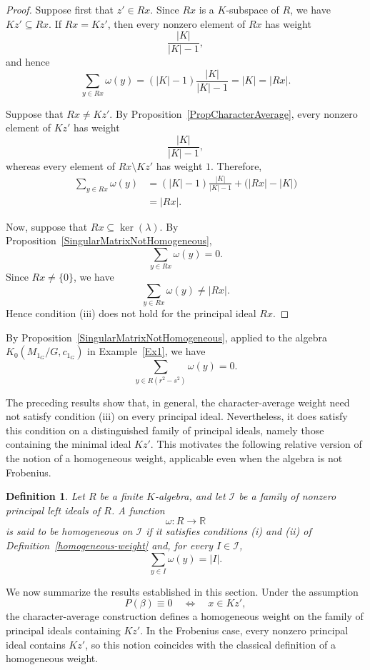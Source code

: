 \documentclass[11pt,reqno]{amsart}
\theoremstyle{plain}
\newtheorem{ddef}[thm]{Definition}
\theoremstyle{remark}
\theoremstyle{definition}
\begin{document}
\begin{proof}
Suppose first that \(z'\in Rx\). Since \(Rx\) is a \(K\)-subspace of \(R\),
we have
\(Kz'\subseteq Rx.\)
If \(Rx=Kz'\), then every nonzero element of \(Rx\) has weight
\[
\frac{|K|}{|K|-1},
\]
and hence
\[
\sum_{y\in Rx}\omega(y)
=
(|K|-1)\frac{|K|}{|K|-1}
=
|K|
=
|Rx|.
\]

Suppose that \(Rx\neq Kz'\). By
Proposition~\ref{PropCharacterAverage}, every nonzero element of \(Kz'\)
has weight
\[
\frac{|K|}{|K|-1},
\]
whereas every element of \(Rx\setminus Kz'\) has weight \(1\).
Therefore,
\[
\begin{aligned}
\sum_{y\in Rx}\omega(y)
&=
(|K|-1)\frac{|K|}{|K|-1}
+
\bigl(|Rx|-|K|\bigr)\\
&=
|Rx|.
\end{aligned}
\]

Now, suppose that
\(Rx\subseteq\ker(\lambda).\)
By Proposition~\ref{SingularMatrixNotHomogeneous},
\[
\sum_{y\in Rx}\omega(y)=0.
\]
Since \(Rx\neq\{0\}\), we have
\[
\sum_{y\in Rx}\omega(y)\neq |Rx|.
\]
Hence condition {\rm(iii)} does not hold for the principal ideal \(Rx\).
\end{proof}

By Proposition~\ref{SingularMatrixNotHomogeneous}, applied to the algebra
\(K_0(M_{1_G}/G,c_{1_G})\) in Example~\ref{Ex1}, we have
\[
\sum_{y\in R(r^2-s^2)}\omega(y)=0.
\]

The preceding results show that, in general, the character-average weight need not satisfy condition {\rm(iii)} on every principal ideal. Nevertheless, it does satisfy this condition on a distinguished family of principal ideals, namely those containing the minimal ideal \(Kz'\). This motivates the following relative version of the notion of a homogeneous weight, applicable even when the algebra is not Frobenius.

\begin{ddef}\label{RelativeHomogeneousWeight}
Let \(R\) be a finite \(K\)-algebra, and let \(\mathcal{I}\) be a family of
nonzero principal left ideals of \(R\). A function
\[
\omega:R\longrightarrow\mathbb{R}
\]
is said to be homogeneous on \(\mathcal{I}\) if it satisfies conditions
{\rm(i)} and {\rm(ii)} of Definition~\ref{homogeneous-weight} and, for every
\(I\in\mathcal{I}\),
\[
\sum_{y\in I}\omega(y)=|I|.
\]
\end{ddef}

We now summarize the results established in this section. Under the assumption
\[
P(\beta)\equiv0
\quad\Longleftrightarrow\quad
x\in Kz',
\]
the character-average construction defines a homogeneous weight on the family of principal ideals containing \(Kz'\). In the Frobenius case, every nonzero principal ideal contains \(Kz'\), so this notion coincides with the classical definition of a homogeneous weight.
\end{document}
